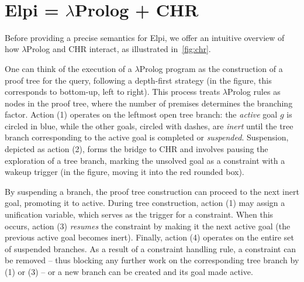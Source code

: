 \documentclass{these-ISSS}
\newenvironment{elpicode}
  {\VerbatimEnvironment\begin{elpibox}\begin{xelpicode}}{\end{xelpicode}
\end{elpibox}}
\begin{document}





\newpage
~
\newpage
\section{Elpi = $\lambda$Prolog + CHR}\label{sec:elpiLP+CHR}


Before providing a precise semantics for Elpi, we offer an intuitive overview of
how $\lambda$Prolog and CHR interact, as illustrated in~\cref{fig:chr}.

One can think of the execution of a $\lambda$Prolog program as the construction
of a proof tree for the query, following a depth-first strategy (in the figure,
this corresponds to bottom-up, left to right). This process treats
$\lambda$Prolog rules as nodes in the proof tree, where the number of premises
determines the branching factor. Action (1) operates on the leftmost open tree
branch: the \emph{active} goal $g$ is circled in blue, while the other goals,
circled with dashes, are \emph{inert} until the tree branch corresponding to the
active goal is completed or \emph{suspended}. Suspension, depicted as action (2),
forms the bridge to CHR and involves pausing the exploration of a tree branch,
marking the unsolved goal as a constraint with a wakeup trigger (in the figure,
moving it into the red rounded box).

By suspending a branch, the proof tree construction can proceed to the next
inert goal, promoting it to active. During tree construction, action (1) may
assign a unification variable, which serves as the trigger for a constraint.
When this occurs, action (3) \emph{resumes} the constraint by making it the next
active goal (the previous active goal becomes inert).
Finally, action (4) operates on the entire set of suspended
branches. As a result of a constraint handling rule, a constraint can be
removed -- thus blocking any further work on the corresponding tree branch by (1)
or (3) -- or a new branch can be created and its goal made active.
\end{document}
